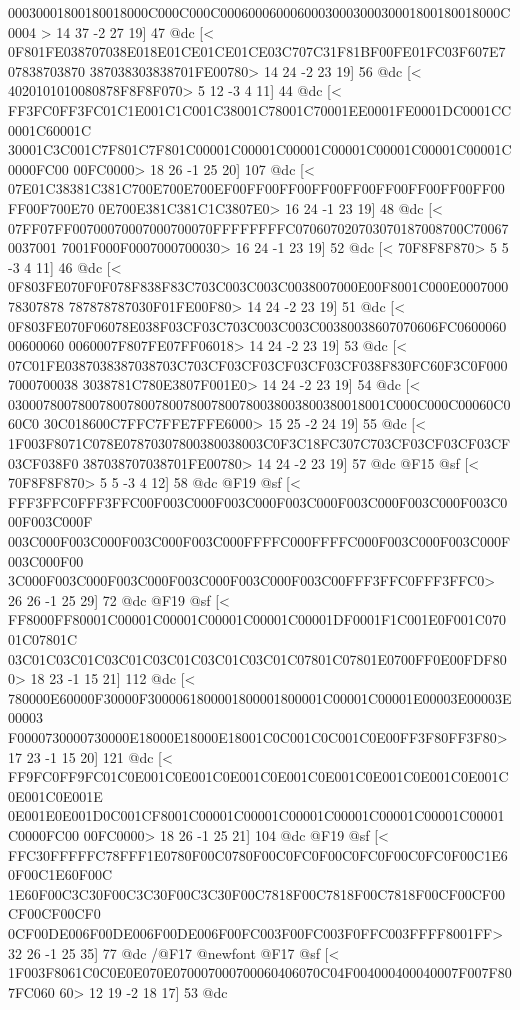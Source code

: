 {{{{{{{{{{{{{{{{{{{{{{{00030001800180018000C000C000C0006000600060003000300030001800180018000C0004
>
	 14 37 -2 27 19] 47 @dc
[<
0F801FE038707038E018E01CE01CE01CE03C707C31F81BF00FE01FC03F607E707838703870
387038303838701FE00780>
	 14 24 -2 23 19] 56 @dc
[<
4020101010080878F8F8F070>
	 5 12 -3 4 11] 44 @dc
[<
FF3FC0FF3FC01C1E001C1C001C38001C78001C70001EE0001FE0001DC0001CC0001C60001C
30001C3C001C7F801C7F801C00001C00001C00001C00001C00001C00001C00001C0000FC00
00FC0000>
	 18 26 -1 25 20] 107 @dc
[<
07E01C38381C381C700E700E700EF00FF00FF00FF00FF00FF00FF00FF00FF00FF00F700E70
0E700E381C381C1C3807E0>
	 16 24 -1 23 19] 48 @dc
[<
07FF07FF00700070007000700070FFFFFFFFC070607020703070187008700C700670037001
7001F000F0007000700030>
	 16 24 -1 23 19] 52 @dc
[<
70F8F8F870>
	 5 5 -3 4 11] 46 @dc
[<
0F803FE070F0F078F838F83C703C003C003C0038007000E00F8001C000E000700078307878
787878787030F01FE00F80>
	 14 24 -2 23 19] 51 @dc
[<
0F803FE070F06078E038F03CF03C703C003C003C00380038607070606FC060006000600060
0060007F807FE07FF06018>
	 14 24 -2 23 19] 53 @dc
[<
07C01FE0387038387038703C703CF03CF03CF03CF03CF038F830FC60F3C0F0007000700038
3038781C780E3807F001E0>
	 14 24 -2 23 19] 54 @dc
[<
030007800780078007800780078007800780038003800380018001C000C000C00060C060C0
30C018600C7FFC7FFE7FFE6000>
	 15 25 -2 24 19] 55 @dc
[<
1F003F8071C078E07870307800380038003C0F3C18FC307C703CF03CF03CF03CF03CF038F0
387038707038701FE00780>
	 14 24 -2 23 19] 57 @dc
@F15 @sf
[<
70F8F8F870>
	 5 5 -3 4 12] 58 @dc
@F19 @sf
[<
FFF3FFC0FFF3FFC00F003C000F003C000F003C000F003C000F003C000F003C000F003C000F
003C000F003C000F003C000F003C000FFFFC000FFFFC000F003C000F003C000F003C000F00
3C000F003C000F003C000F003C000F003C000F003C00FFF3FFC0FFF3FFC0>
	 26 26 -1 25 29] 72 @dc
@F19 @sf
[<
FF8000FF80001C00001C00001C00001C00001C00001DF0001F1C001E0F001C07001C07801C
03C01C03C01C03C01C03C01C03C01C03C01C07801C07801E0700FF0E00FDF800>
	 18 23 -1 15 21] 112 @dc
[<
780000E60000F30000F3000061800001800001800001C00001C00001E00003E00003E00003
F0000730000730000E18000E18000E18001C0C001C0C001C0E00FF3F80FF3F80>
	 17 23 -1 15 20] 121 @dc
[<
FF9FC0FF9FC01C0E001C0E001C0E001C0E001C0E001C0E001C0E001C0E001C0E001C0E001E
0E001E0E001D0C001CF8001C00001C00001C00001C00001C00001C00001C00001C0000FC00
00FC0000>
	 18 26 -1 25 21] 104 @dc
@F19 @sf
[<
FFC30FFFFFC78FFF1E0780F00C0780F00C0FC0F00C0FC0F00C0FC0F00C1E60F00C1E60F00C
1E60F00C3C30F00C3C30F00C3C30F00C7818F00C7818F00C7818F00CF00CF00CF00CF00CF0
0CF00DE006F00DE006F00DE006F00FC003F00FC003F0FFC003FFFF8001FF>
	 32 26 -1 25 35] 77 @dc
/@F17 @newfont
@F17 @sf
[<
1F003F8061C0C0E0E070E070007000700060406070C04F004000400040007F007F807FC060
60>
	 12 19 -2 18 17] 53 @dc
}}}}}}}}}}}}}}}}}}}}}}}
